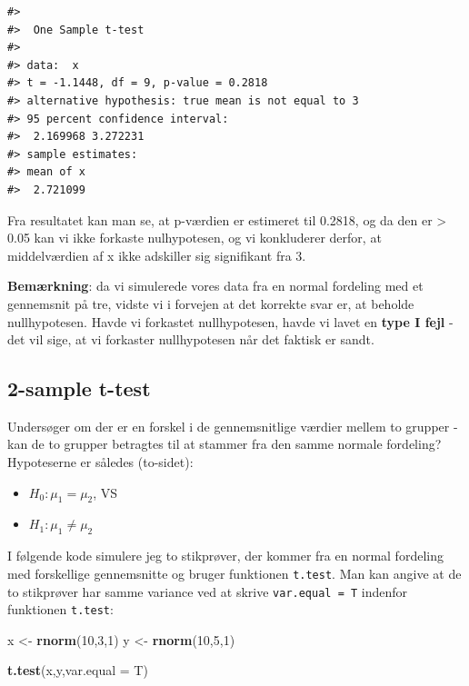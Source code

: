 \documentclass[
]{book}
\newenvironment{Shaded}{\begin{snugshade}}{\end{snugshade}}
\newcommand{\AttributeTok}[1]{\textcolor[rgb]{0.27,0.27,0.27}{#1}}
\newcommand{\DecValTok}[1]{\textcolor[rgb]{0.06,0.06,0.06}{#1}}
\newcommand{\FunctionTok}[1]{\textcolor[rgb]{0.27,0.27,0.27}{\textbf{#1}}}
\newcommand{\NormalTok}[1]{#1}
\newcommand{\OtherTok}[1]{\textcolor[rgb]{0.37,0.37,0.37}{#1}}
\providecommand{\tightlist}{%
  \setlength{\itemsep}{0pt}\setlength{\parskip}{0pt}}
\begin{document}
\begin{verbatim}
#> 
#>  One Sample t-test
#> 
#> data:  x
#> t = -1.1448, df = 9, p-value = 0.2818
#> alternative hypothesis: true mean is not equal to 3
#> 95 percent confidence interval:
#>  2.169968 3.272231
#> sample estimates:
#> mean of x 
#>  2.721099
\end{verbatim}

Fra resultatet kan man se, at p-værdien er estimeret til 0.2818, og da den er \textgreater{} 0.05 kan vi ikke forkaste nulhypotesen, og vi konkluderer derfor, at middelværdien af x ikke adskiller sig signifikant fra 3.

\textbf{Bemærkning}: da vi simulerede vores data fra en normal fordeling med et gennemsnit på tre, vidste vi i forvejen at det korrekte svar er, at beholde nullhypotesen. Havde vi forkastet nullhypotesen, havde vi lavet en \textbf{type I fejl} - det vil sige, at vi forkaster nullhypotesen når det faktisk er sandt.

\subsection{2-sample t-test}\label{sample-t-test-1}

Undersøger om der er en forskel i de gennemsnitlige værdier mellem to grupper - kan de to grupper betragtes til at stammer fra den samme normale fordeling? Hypoteserne er således (to-sidet):

\begin{itemize}
\tightlist
\item
  \(H_{0}: \mu_{1} = \mu_{2}\), VS
\item
  \(H_{1}: \mu_{1} \neq \mu_{2}\)
\end{itemize}

I følgende kode simulere jeg to stikprøver, der kommer fra en normal fordeling med forskellige gennemsnitte og bruger funktionen \texttt{t.test}. Man kan angive at de to stikprøver har samme variance ved at skrive \texttt{var.equal\ =\ T} indenfor funktionen \texttt{t.test}:

\begin{Shaded}
\begin{Highlighting}[]
\NormalTok{x }\OtherTok{\textless{}{-}} \FunctionTok{rnorm}\NormalTok{(}\DecValTok{10}\NormalTok{,}\DecValTok{3}\NormalTok{,}\DecValTok{1}\NormalTok{)}
\NormalTok{y }\OtherTok{\textless{}{-}} \FunctionTok{rnorm}\NormalTok{(}\DecValTok{10}\NormalTok{,}\DecValTok{5}\NormalTok{,}\DecValTok{1}\NormalTok{)}

\FunctionTok{t.test}\NormalTok{(x,y,}\AttributeTok{var.equal =}\NormalTok{ T)}
\end{Highlighting}
\end{Shaded}
\end{document}
